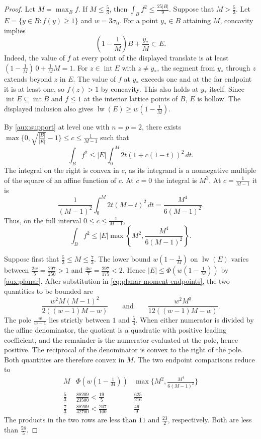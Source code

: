 \documentclass[reqno, 11pt]{article}
\numberwithin{equation}{section}
\theoremstyle{definition}
\DeclareMathOperator{\lw}{lw}
\DeclareMathOperator{\intr}{int}
\begin{document}
\begin{proof}
Let $M=\max_B f$. If $M\le\frac{5}{3}$, then $\int_B f^2\le\frac{25|B|}{9}$.
Suppose that $M>\frac{5}{3}$. Let $E=\{y\in B:f(y)\ge1\}$ and $w=3\sigma_0$. For a point
$y_*\in B$ attaining $M$, concavity implies
\[
                 (1-\frac{1}{M})B+\frac{y_*}{M}\subset E.
\]
Indeed, the value of $f$ at every point of the displayed translate
is at least $(1-\frac{1}{M})\,0+\frac{1}{M}M=1$. For
$z\in\intr E$ with $z\ne y_*$, the segment from $y_*$ through $z$
extends beyond $z$ in $E$. The value of $f$ at $y_*$ exceeds one and
at the far endpoint it is at least one, so $f(z)>1$ by concavity.
This also holds at $y_*$ itself. Since $\intr E\subseteq\intr B$
and $f\le1$ at the interior lattice points of $B$, $E$ is hollow. The displayed inclusion also gives
$\lw(E)\ge w(1-\frac{1}{M})$.

By \cref{aux:support} at level one with $n=p=2$, there exists
$\max\{0,\sqrt{\frac{|B|}{|E|}}-1\}\le c\le\frac{1}{M-1}$ such that
\[
                    \int_B f^2\le |E|\int_0^M 2t(1+c(1-t))^2\,dt .
\]
The integral on the right is convex in $c$, as its integrand is a
nonnegative multiple of the square of an affine function of $c$.
At $c=0$ the integral is $M^2$. At $c=\frac{1}{M-1}$ it is
\[
 \frac{1}{(M-1)^2}\int_0^M 2t(M-t)^2\,dt
       =\frac{M^4}{6(M-1)^2}.
\]
Thus, on the full interval $0\le c\le\frac{1}{M-1}$,
\begin{equation}\label{eq:planar-moment-endpoints}
   \int_B f^2\le |E|\max\left\{M^2,\frac{M^4}{6(M-1)^2}\right\}.
\end{equation}

Suppose first that $\frac{5}{3}\le M\le\frac{7}{3}$. The lower
bound $w(1-\frac{1}{M})$ on $\lw(E)$ varies between
$\frac{2w}{5}=\frac{297}{250}>1$ and $\frac{4w}{7}=\frac{297}{175}<2$.
Hence $|E|\le\Phi(w(1-\frac{1}{M}))$ by \cref{aux:planar}. After
substitution in \eqref{eq:planar-moment-endpoints}, the two quantities
to be bounded are
\[
 \frac{w^2 M(M-1)^2}{2((w-1)M-w)}
 \qquad\text{and}\qquad
 \frac{w^2 M^3}{12((w-1)M-w)} .
\]
The pole $\frac{w}{w-1}$ lies strictly between $1$ and $\frac{5}{3}$.
When either numerator is divided by the affine denominator, the
quotient is a quadratic with positive leading coefficient, and the
remainder is the numerator evaluated at the pole, hence positive.
The reciprocal of the denominator is convex to the right of the pole.
Both quantities are therefore convex in $M$. The two endpoint
comparisons reduce to
\[
\begin{array}{c|cc}
 M&\Phi(w(1-\frac{1}{M}))&
       \max\{M^2,\frac{M^4}{6(M-1)^2}\}\\ \hline
 \frac{5}{3}&\frac{88209}{23500}<\frac{19}{5}&\frac{625}{216}\\[2pt]
 \frac{7}{3}&\frac{88209}{42700}<\frac{207}{100}&\frac{49}{9}
\end{array}
\]
The products in the two rows are less than $11$ and $\frac{23}{2}$,
respectively. Both are less than $\frac{58}{5}$.


\end{proof}
\end{document}
